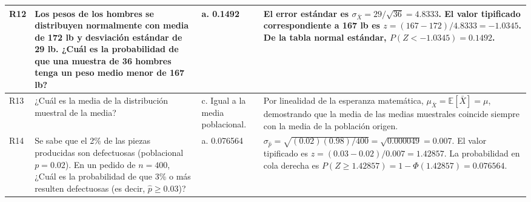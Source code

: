 {\begin{center}
\begin{longtable}{p{1.2cm}p{4.3cm}p{3.8cm}p{5.3cm}}
R12 & Los pesos de los hombres se distribuyen normalmente con media de 172 lb y desviación estándar de 29 lb. ¿Cuál es la probabilidad de que una muestra de 36 hombres tenga un peso medio menor de 167 lb? & a. 0.1492 & El error estándar es $\sigma_{\bar{X}} = 29 / \sqrt{36} = 4.8333$. El valor tipificado correspondiente a 167 lb es $z = (167 - 172)/4.8333 = -1.0345$. De la tabla normal estándar, $P(Z < -1.0345) = 0.1492$. \citep{anderson2012,wackerly2010} \\\hline
R13 & ¿Cuál es la media de la distribución muestral de la media? & c. Igual a la media poblacional. & Por linealidad de la esperanza matemática, $\mu_{\bar{X}} = \mathbb{E}[\bar{X}] = \mu$, demostrando que la media de las medias muestrales coincide siempre con la media de la población origen. \citep{anderson2012,wackerly2010} \\\hline
R14 & Se sabe que el 2\% de las piezas producidas son defectuosas (poblacional $p = 0.02$). En un pedido de $n = 400$, ¿Cuál es la probabilidad de que 3\% o más resulten defectuosas (es decir, $\hat{p} \ge 0.03$)? & a. 0.076564 & $\sigma_{\hat{p}} = \sqrt{(0.02)(0.98)/400} = \sqrt{0.000049} = 0.007$. El valor tipificado es $z = (0.03 - 0.02)/0.007 = 1.42857$. La probabilidad en cola derecha es $P(Z \ge 1.42857) = 1 - \Phi(1.42857) = 0.076564$. \citep{anderson2012,lind2012} \\\hline
\end{longtable}
\end{center}


}
